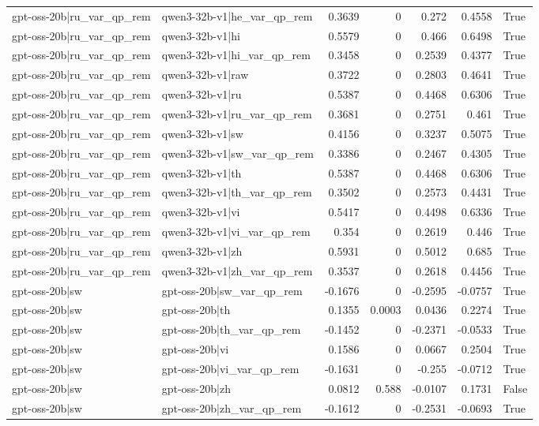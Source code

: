 \begin{table}
\begin{tabular}{l l r r r r l}
gpt-oss-20b|ru_var_qp_rem & qwen3-32b-v1|he_var_qp_rem & 0.3639 & 0 & 0.272 & 0.4558 & True \\
gpt-oss-20b|ru_var_qp_rem & qwen3-32b-v1|hi & 0.5579 & 0 & 0.466 & 0.6498 & True \\
gpt-oss-20b|ru_var_qp_rem & qwen3-32b-v1|hi_var_qp_rem & 0.3458 & 0 & 0.2539 & 0.4377 & True \\
gpt-oss-20b|ru_var_qp_rem & qwen3-32b-v1|raw & 0.3722 & 0 & 0.2803 & 0.4641 & True \\
gpt-oss-20b|ru_var_qp_rem & qwen3-32b-v1|ru & 0.5387 & 0 & 0.4468 & 0.6306 & True \\
gpt-oss-20b|ru_var_qp_rem & qwen3-32b-v1|ru_var_qp_rem & 0.3681 & 0 & 0.2751 & 0.461 & True \\
gpt-oss-20b|ru_var_qp_rem & qwen3-32b-v1|sw & 0.4156 & 0 & 0.3237 & 0.5075 & True \\
gpt-oss-20b|ru_var_qp_rem & qwen3-32b-v1|sw_var_qp_rem & 0.3386 & 0 & 0.2467 & 0.4305 & True \\
gpt-oss-20b|ru_var_qp_rem & qwen3-32b-v1|th & 0.5387 & 0 & 0.4468 & 0.6306 & True \\
gpt-oss-20b|ru_var_qp_rem & qwen3-32b-v1|th_var_qp_rem & 0.3502 & 0 & 0.2573 & 0.4431 & True \\
gpt-oss-20b|ru_var_qp_rem & qwen3-32b-v1|vi & 0.5417 & 0 & 0.4498 & 0.6336 & True \\
gpt-oss-20b|ru_var_qp_rem & qwen3-32b-v1|vi_var_qp_rem & 0.354 & 0 & 0.2619 & 0.446 & True \\
gpt-oss-20b|ru_var_qp_rem & qwen3-32b-v1|zh & 0.5931 & 0 & 0.5012 & 0.685 & True \\
gpt-oss-20b|ru_var_qp_rem & qwen3-32b-v1|zh_var_qp_rem & 0.3537 & 0 & 0.2618 & 0.4456 & True \\
gpt-oss-20b|sw & gpt-oss-20b|sw_var_qp_rem & -0.1676 & 0 & -0.2595 & -0.0757 & True \\
gpt-oss-20b|sw & gpt-oss-20b|th & 0.1355 & 0.0003 & 0.0436 & 0.2274 & True \\
gpt-oss-20b|sw & gpt-oss-20b|th_var_qp_rem & -0.1452 & 0 & -0.2371 & -0.0533 & True \\
gpt-oss-20b|sw & gpt-oss-20b|vi & 0.1586 & 0 & 0.0667 & 0.2504 & True \\
gpt-oss-20b|sw & gpt-oss-20b|vi_var_qp_rem & -0.1631 & 0 & -0.255 & -0.0712 & True \\
gpt-oss-20b|sw & gpt-oss-20b|zh & 0.0812 & 0.588 & -0.0107 & 0.1731 & False \\
gpt-oss-20b|sw & gpt-oss-20b|zh_var_qp_rem & -0.1612 & 0 & -0.2531 & -0.0693 & True \\

\end{tabular}
\end{table}
